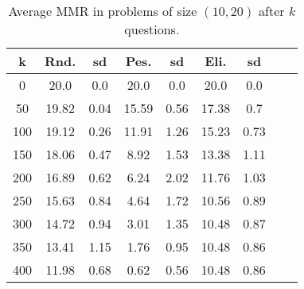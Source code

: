\documentclass{article}
\begin{document}
\begin{table}
	\caption{Average MMR in problems of size $(10, 20)$ after $k$ questions.}
	\label{tab:biggerSize}
	\begin{tabular}{S[table-figures-integer=3, table-figures-decimal=0]S[table-number-alignment = right]@{ ± }S[table-number-alignment = left, table-figures-integer=1]S[table-number-alignment = right]@{ ± }S[table-number-alignment = left, table-figures-integer=1]S[table-number-alignment = right]@{ ± }S[table-number-alignment = left, table-figures-integer=1]S[table-number-alignment = right]@{ ± }S[table-number-alignment = left]}
		\toprule
		{k} & {Rnd.} & {sd} & {Pes.} & {sd} & {Eli.} & {sd} \\
		 &20.0 & 0.0 & 20.0 & 0.0&  20.0 & 0.0 \\
		50 & 19.82 & 0.04 &	15.59 &0.56	&17.38& 0.7\\
		100 & 19.12	& 0.26&	11.91&	1.26 &15.23& 0.73\\
		150 & 18.06	& 0.47&	8.92&	1.53 &13.38& 1.11\\
		200 & 16.89	& 0.62&6.24&2.02&11.76& 1.03\\
		250 & 15.63 & 0.84&	4.64&1.72&10.56& 0.89\\
		300 & 14.72	& 0.94&	3.01& 1.35 &10.48& 0.87\\
		350 & 13.41	& 1.15& 1.76& 0.95&10.48& 0.86\\
		400 & 11.98	& 0.68&	0.62&0.56 &10.48& 0.86\\
		\bottomrule
	\end{tabular}
\end{table}
\end{document}
